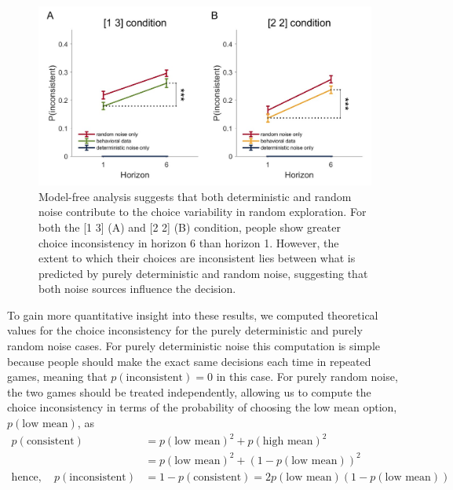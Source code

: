 \documentclass[12pt]{article}
\begin{document}
	\begin{figure}[H]
		\begin{center}
			\includegraphics[width=\textwidth]{figures/RanDetNoise_pinconsistent.jpg}
			\caption{Model-free analysis suggests that both deterministic and random noise contribute to the choice variability in random exploration. For both the [1 3] (A) and [2 2] (B) condition, people show greater choice inconsistency in horizon 6 than horizon 1. However, the extent to which their choices are inconsistent lies between what is predicted by purely deterministic and random noise, suggesting that both noise sources influence the decision.}
			\label{fig:mf2}
		\end{center}
	\end{figure}
	
	To gain more quantitative insight into these results, we computed theoretical values for the choice inconsistency for the purely deterministic and purely random noise cases.  For purely deterministic noise this computation is simple because people should make the exact same decisions each time in repeated games, meaning that $p(\mbox{inconsistent}) = 0$ in this case. For purely random noise, the two games should be treated independently, allowing us to compute the choice inconsistency in terms of the probability of choosing the low mean option, $p(\mbox{low mean})$, as
	\begin{equation*}
		\begin{split}
			p(\mbox{consistent}) &= p(\mbox{low mean})^2 + p(\mbox{high mean})^2\\
			&= p(\mbox{low mean})^2 + (1-p(\mbox{low mean}))^2\\ 
			\mbox{hence},\quad p(\mbox{inconsistent}) &=  
			1 - p(\mbox{consistent}) = 
			2 p(\mbox{low mean})(1-p(\mbox{low mean}))
		\end{split}
	\end{equation*}
	
\end{document}
